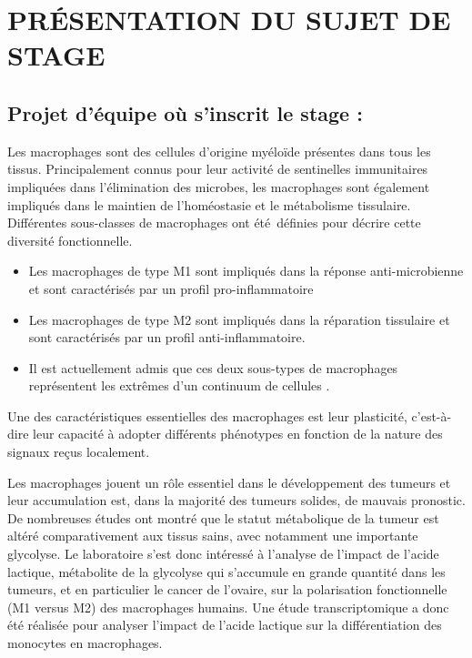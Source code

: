 \documentclass[a4paper,10pt]{article}
\begin{document}
\section{PR\'{E}SENTATION DU SUJET DE STAGE }
\subsection{Projet d’équipe où s’inscrit le stage :}
Les macrophages sont des cellules d’origine myéloïde présentes dans tous les tissus.
Principalement connus pour leur activité de sentinelles immunitaires impliquées dans l’élimination des microbes, les macrophages sont également impliqués dans le maintien de l’homéostasie et le métabolisme tissulaire. Différentes sous-classes de macrophages ont été définies pour décrire cette diversité fonctionnelle. 
\begin{itemize}
 \item Les macrophages de type M1 sont impliqués dans la réponse anti-microbienne et sont caractérisés par un profil pro-inflammatoire 
\item Les macrophages de type M2 sont impliqués dans la réparation tissulaire et sont caractérisés par un profil anti-inflammatoire. 
\item Il est actuellement admis que ces deux sous-types de macrophages représentent les extrêmes d’un continuum de cellules \cite{sica2012macrophage}.
\end{itemize}
Une des caractéristiques essentielles des macrophages est leur plasticité, c’est-à-dire leur capacité à adopter différents phénotypes en fonction de la nature des signaux reçus localement.
 
Les macrophages jouent un rôle essentiel dans le développement des tumeurs et leur accumulation est, dans la majorité des tumeurs solides, de mauvais pronostic. De nombreuses études ont montré que le statut métabolique de la tumeur est altéré comparativement aux tissus sains, avec notamment une importante glycolyse. Le laboratoire s’est donc intéressé à l’analyse de l’impact de l’acide lactique, métabolite de la glycolyse qui s’accumule en grande quantité dans les tumeurs, et en particulier le cancer de l’ovaire, sur la polarisation fonctionnelle (M1 versus M2) des macrophages humains.
Une étude transcriptomique a donc été réalisée pour analyser l’impact de l’acide lactique sur la différentiation des monocytes en macrophages.
\end{document}
